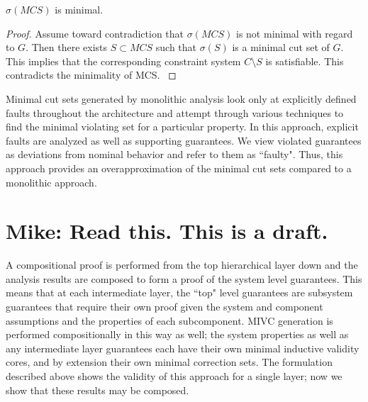 \begin{lemma} $\sigma(MCS)$ is minimal.
\begin{proof}
Assume toward contradiction that $\sigma(MCS)$ is not minimal with regard to $G$. Then there exists $S \subset MCS$ such that $\sigma(S)$ is a minimal cut set of $G$. This implies that the corresponding constraint system $C \setminus S$ is satisfiable. This contradicts the minimality of MCS.
\label{lemma:min}
\end{proof}
\end{lemma}

Minimal cut sets generated by monolithic analysis look only at explicitly defined faults throughout the architecture and attempt through various techniques to find the minimal violating set for a particular property. In this approach, explicit faults are analyzed as well as supporting guarantees. We view violated guarantees as deviations from nominal behavior and refer to them as ``faulty". Thus, this approach provides an overapproximation of the minimal cut sets compared to a monolithic approach. %

\section{Mike: Read this. This is a draft.}
A compositional proof is performed from the top hierarchical layer down and the analysis results are composed to form a proof of the system level guarantees. This means that at each intermediate layer, the ``top" level guarantees are subsystem guarantees that require their own proof given the system and component assumptions and the properties of each subcomponent. MIVC generation is performed compositionally in this way as well; the system properties as well as any intermediate layer guarantees each have their own minimal inductive validity cores, and by extension their own minimal correction sets. The formulation described above shows the validity of this approach for a single layer; now we show that these results may be composed. 

